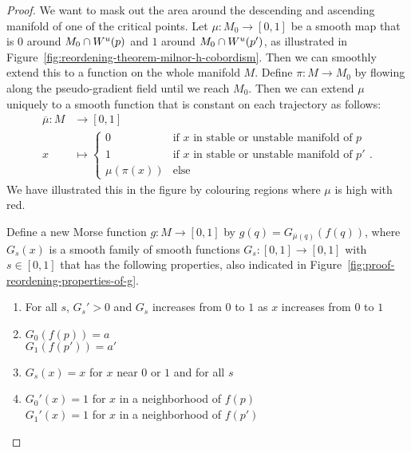     \begin{proof}
        We want to mask out the area around the descending and ascending manifold of one of the critical points.
        Let $\mu: M_0 \to  [0,1]$ be a smooth map that is $0$ around  $ M_0 \cap W^u(p)$ and $1$ around $M_0 \cap W^u(p')$, as illustrated in Figure~\ref{fig:reordening-theorem-milnor-h-cobordism}.
        Then we can smoothly extend this to a function on the whole manifold $M$.
        Define $\pi: M \to  M_0$ by flowing along the pseudo-gradient field until we reach $M_0$.
        Then we can extend $\mu$ uniquely to a smooth function that is constant on each trajectory as follows:
        \begin{align*}
            \overline{\mu}: M &\longrightarrow [0,1] \\
            x &\longmapsto \begin{cases}
                0 & \text{if $x$ in stable or unstable manifold of $p$}\\
                1 & \text{if $x$ in stable or unstable manifold of $p'$}\\ 
                \mu(\pi(x)) & \text{else}
            \end{cases}
        .\end{align*}
        We have illustrated this in the figure by colouring regions where $\mu$ is high with red.

        Define a new Morse function $g: M \to  [0,1]$ by $g(q) = G_{\overline{\mu}(q)}(f(q))$, where $G_{s}(x)$ is a smooth family of smooth functions $G_s: [0,1] \to  [0,1]$ with $s \in [0,1]$ that has the following properties, also indicated in Figure~\ref{fig:proof-reordening-properties-of-g}.
        \begin{marginfigure}
            \centering
            \caption{Necessary properties of $G$ in the proof on reordering critical points are indicated in yellow.}
            \label{fig:proof-reordening-properties-of-g}
        \end{marginfigure}
        \begin{enumerate}
            \item For all $s$, $G_s' > 0$ and $G_s$ increases from $0$ to  $1$ as $x$ increases from  $0$ to  $1$
            \item  $G_0(f(p)) = a$\\ $G_1(f(p')) = a'$
            \item  $G_s(x) = x$ for $x$ near  $0$ or  $1$ and for all $s$ 
            \item  $G_0'(x) = 1$ for $x$  in a neighborhood of $f(p)$\\
            $G_1'(x) = 1$ for $x$  in a neighborhood of $f(p')$
        \end{enumerate}
    \end{proof}

